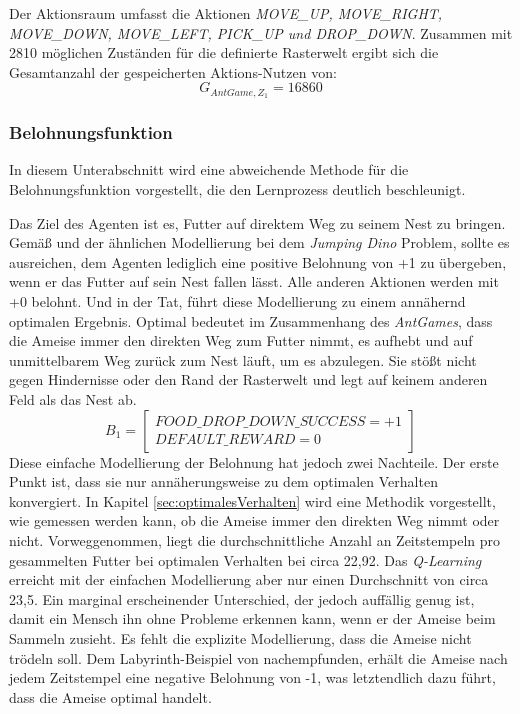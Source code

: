 Der Aktionsraum umfasst die Aktionen \textit{MOVE\_UP, MOVE\_RIGHT,
MOVE\_DOWN,
MOVE\_LEFT,
PICK\_UP und
DROP\_DOWN}. Zusammen mit 2810 möglichen Zuständen für die definierte Rasterwelt ergibt sich die Gesamtanzahl der gespeicherten Aktions-Nutzen von:
\begin{equation}
    G_{AntGame,Z_1} = 16860
\end{equation}

\subsubsection{Belohnungsfunktion}
In diesem Unterabschnitt wird eine abweichende Methode für die Belohnungsfunktion vorgestellt, die den Lernprozess deutlich beschleunigt.
\par
Das Ziel des Agenten ist es, Futter auf direktem Weg zu seinem Nest zu bringen. Gemäß \cite{Sutton1998} und der ähnlichen Modellierung bei dem \textit{Jumping Dino} Problem, sollte es ausreichen, dem Agenten lediglich eine positive Belohnung von +1 zu übergeben, wenn er das Futter auf sein Nest fallen lässt. Alle anderen Aktionen werden mit +0 belohnt. Und in der Tat, führt diese Modellierung zu einem annähernd optimalen Ergebnis. \glqq Optimal\grqq{} bedeutet im Zusammenhang des \textit{AntGames}, dass die Ameise immer den direkten Weg zum Futter nimmt, es aufhebt und auf unmittelbarem Weg zurück zum Nest läuft, um es abzulegen. Sie stößt nicht gegen Hindernisse oder den Rand der Rasterwelt und legt auf keinem anderen Feld als das Nest ab.
\begin{equation}
    B_{1} =  \begin{bmatrix} 
        FOOD\_DROP\_DOWN\_SUCCESS = +1\\
        DEFAULT\_REWARD = 0           
 \end{bmatrix}
\end{equation}
Diese einfache Modellierung der Belohnung hat jedoch zwei Nachteile. Der erste Punkt ist, dass sie nur annäherungsweise zu dem optimalen Verhalten konvergiert. In Kapitel \ref{sec:optimalesVerhalten} wird eine Methodik vorgestellt, wie gemessen werden kann, ob die Ameise immer den direkten Weg nimmt oder nicht. Vorweggenommen, liegt die durchschnittliche Anzahl an Zeitstempeln pro gesammelten Futter bei optimalen Verhalten bei circa 22,92. Das \textit{Q-Learning} erreicht mit der einfachen Modellierung aber nur einen Durchschnitt von circa 23,5. Ein marginal erscheinender Unterschied, der jedoch auffällig genug ist, damit ein Mensch ihn ohne Probleme erkennen kann, wenn er der Ameise beim Sammeln zusieht. Es fehlt die explizite Modellierung, dass die Ameise nicht \glqq trödeln\grqq{} soll. Dem Labyrinth-Beispiel von \cite{Sutton1998} nachempfunden, erhält die Ameise nach jedem Zeitstempel eine negative Belohnung von -1, was letztendlich dazu führt, dass die Ameise optimal handelt.
